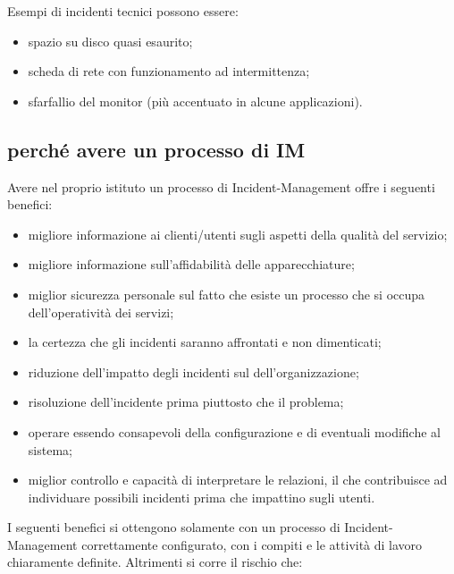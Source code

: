 Esempi di incidenti tecnici possono essere:

\begin{itemize}
\item{spazio su disco quasi esaurito;}
\item{scheda di rete con funzionamento ad intermittenza;}
\item{sfarfallio del monitor (più accentuato in alcune applicazioni).}
\end{itemize}

\subsection[Perché avere un processo di IM]{perché avere un processo di IM}
\label{prc-why-im-process}
Avere nel proprio istituto un processo di \ac{Incident-Management} offre i seguenti benefici:

\begin{itemize}
\item{migliore informazione ai clienti/utenti sugli aspetti della qualità del servizio;}
\item{migliore informazione sull'affidabilità delle apparecchiature;}
\item{miglior sicurezza personale sul fatto che esiste un processo che si occupa dell'operatività dei servizi;}
\item{la certezza che gli incidenti saranno affrontati e non dimenticati;}
\item{riduzione dell'impatto degli incidenti sul  dell'organizzazione;}
\item{risoluzione dell'incidente prima piuttosto che il problema;}
\item{operare essendo consapevoli della configurazione e di eventuali modifiche al sistema;}
\item{miglior controllo e capacità di interpretare le relazioni, il che contribuisce ad individuare possibili incidenti prima che impattino sugli utenti.}
\end{itemize}

I seguenti benefici si ottengono solamente con un processo di \ac{Incident-Management} correttamente configurato, con i compiti e le attività di lavoro chiaramente definite. Altrimenti si corre il rischio che:

